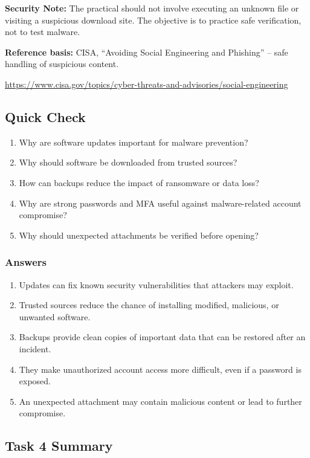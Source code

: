 \documentclass[12pt,a4paper]{article}
\newcommand{\referenceblock}[2]{%
\begin{samepage}
\noindent\textbf{Reference basis:} #1\par
\smallskip
\noindent\url{#2}\par
\end{samepage}
\par\vspace{0.25cm}
}
\begin{document}
\textbf{Security Note:} The practical should not involve executing an
unknown file or visiting a suspicious download site. The objective is
to practice safe verification, not to test malware.

\referenceblock{CISA, ``Avoiding Social Engineering and Phishing'' -- safe handling of suspicious content.}{https://www.cisa.gov/topics/cyber-threats-and-advisories/social-engineering}

\subsection{Quick Check}

\begin{enumerate}
    \item Why are software updates important for malware prevention?
    \item Why should software be downloaded from trusted sources?
    \item How can backups reduce the impact of ransomware or data loss?
    \item Why are strong passwords and MFA useful against malware-related account compromise?
    \item Why should unexpected attachments be verified before opening?
\end{enumerate}

\subsubsection*{Answers}

\begin{enumerate}
    \item Updates can fix known security vulnerabilities that attackers may exploit.
    \item Trusted sources reduce the chance of installing modified, malicious, or unwanted software.
    \item Backups provide clean copies of important data that can be restored after an incident.
    \item They make unauthorized account access more difficult, even if a password is exposed.
    \item An unexpected attachment may contain malicious content or lead to further compromise.
\end{enumerate}

\subsection{Task 4 Summary}
\end{document}
